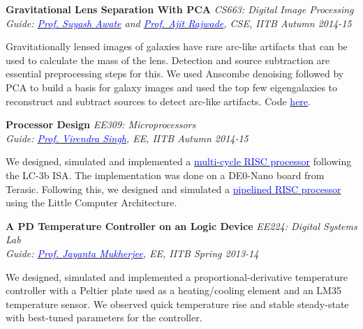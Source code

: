 \documentclass[margin,line]{res}
\newenvironment{list1}{
  \begin{list}{\ding{113}}{%
      \setlength{\itemsep}{0in}
      \setlength{\parsep}{0in} \setlength{\parskip}{0in}
      \setlength{\topsep}{0in} \setlength{\partopsep}{0in} 
      \setlength{\leftmargin}{0.17in}}}{\end{list}}
\begin{document}
\begin{resume}
\vspace*{-0.1in}

{\bf Gravitational Lens Separation With PCA} \hfill \textit{CS663: Digital Image Processing} \\
{\em Guide: \href{https://www.cse.iitb.ac.in/~suyash}{\textcolor{blue}{Prof. Suyash Awate}} and \href{https://www.cse.iitb.ac.in/~ajitvr}{\textcolor{blue}{Prof. Ajit Rajwade}}, CSE, IITB \hfill Autumn 2014-15} \\
\vspace*{-.15in}
\begin{list1}
\item[] Gravitationally lensed images of galaxies have rare arc-like artifacts that can be used to calculate the mass of the lens. Detection and source subtraction are essential preprocessing steps for this. We used Anscombe denoising followed by PCA to build a basis for galaxy images and used the top few eigengalaxies to reconstruct and subtract sources to detect arc-like artifacts. Code \href{https://github.com/alankarkotwal/pca-lens-finder}{\textcolor{blue} {here}}.
\end{list1}

\vspace*{-0.1in}

{\bf Processor Design} \hfill \textit{EE309: Microprocessors} \\
{\em Guide: \href{https://www.ee.iitb.ac.in/~viren/}{\textcolor{blue}{Prof. Virendra Singh}}, EE, IITB \hfill Autumn 2014-15} \\
\vspace*{-.15in}
\begin{list1}
\item[] We designed, simulated and implemented a \href{https://github.com/alankarkotwal/lc-3b-processor}{\textcolor{blue} {multi-cycle RISC processor}} following the LC-3b ISA. The implementation was done on a DE0-Nano board from Terasic. Following this, we designed and simulated a \href{https://github.com/alankarkotwal/lca-processor}{\textcolor{blue} {pipelined RISC processor}} using the Little Computer Architecture.
\end{list1}

\vspace*{-0.1in}

{\bf A PD Temperature Controller on an Logic Device} \hfill \textit{EE224: Digital Systems Lab} \\
{\em Guide: \href{https://www.ee.iitb.ac.in/wiki/faculty/jayanta}{\textcolor{blue}{Prof. Jayanta Mukherjee}}, EE, IITB \hfill Spring 2013-14} \\
\vspace*{-.15in}
\begin{list1}
\item[] We designed, simulated and implemented a proportional-derivative temperature controller with a Peltier plate used as a heating/cooling element and an LM35 temperature sensor. We observed quick temperature rise and stable steady-state with best-tuned parameters for the controller.
\end{list1}


\end{resume}
\end{document}
